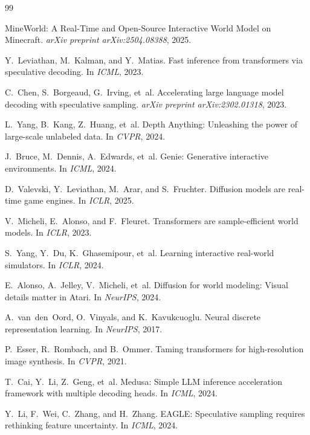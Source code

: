 \documentclass[10pt, twocolumn]{article}
\begin{document}

\begin{thebibliography}{99}
\setlength{\itemsep}{0pt}

MineWorld: A Real-Time and Open-Source Interactive World Model on Minecraft.
\newblock \emph{arXiv preprint arXiv:2504.08388}, 2025.

Y.~Leviathan, M.~Kalman, and Y.~Matias.
\newblock Fast inference from transformers via speculative decoding.
\newblock In \emph{ICML}, 2023.

C.~Chen, S.~Borgeaud, G.~Irving, et~al.
\newblock Accelerating large language model decoding with speculative sampling.
\newblock \emph{arXiv preprint arXiv:2302.01318}, 2023.

L.~Yang, B.~Kang, Z.~Huang, et~al.
\newblock Depth Anything: Unleashing the power of large-scale unlabeled data.
\newblock In \emph{CVPR}, 2024.

J.~Bruce, M.~Dennis, A.~Edwards, et~al.
\newblock Genie: Generative interactive environments.
\newblock In \emph{ICML}, 2024.

D.~Valevski, Y.~Leviathan, M.~Arar, and S.~Fruchter.
\newblock Diffusion models are real-time game engines.
\newblock In \emph{ICLR}, 2025.

V.~Micheli, E.~Alonso, and F.~Fleuret.
\newblock Transformers are sample-efficient world models.
\newblock In \emph{ICLR}, 2023.

S.~Yang, Y.~Du, K.~Ghasemipour, et~al.
\newblock Learning interactive real-world simulators.
\newblock In \emph{ICLR}, 2024.

E.~Alonso, A.~Jelley, V.~Micheli, et~al.
\newblock Diffusion for world modeling: Visual details matter in Atari.
\newblock In \emph{NeurIPS}, 2024.

A.~van~den~Oord, O.~Vinyals, and K.~Kavukcuoglu.
\newblock Neural discrete representation learning.
\newblock In \emph{NeurIPS}, 2017.

P.~Esser, R.~Rombach, and B.~Ommer.
\newblock Taming transformers for high-resolution image synthesis.
\newblock In \emph{CVPR}, 2021.

T.~Cai, Y.~Li, Z.~Geng, et~al.
\newblock Medusa: Simple LLM inference acceleration framework with multiple decoding heads.
\newblock In \emph{ICML}, 2024.

Y.~Li, F.~Wei, C.~Zhang, and H.~Zhang.
\newblock EAGLE: Speculative sampling requires rethinking feature uncertainty.
\newblock In \emph{ICML}, 2024.


\end{thebibliography}
\end{document}
